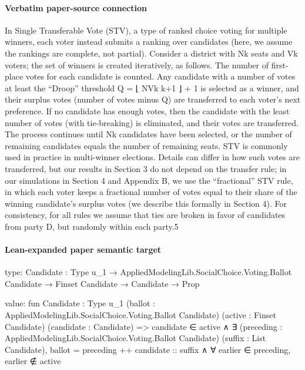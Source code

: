 \documentclass[10pt]{article}
\begin{document}
\paragraph{Verbatim paper-source connection}
\begin{ReviewVerbatim}
In Single Transferable Vote (STV), a type of ranked choice voting for multiple winners, each
voter instead submits a ranking over candidates (here, we assume the rankings are complete, not
partial). Consider a district with Nk seats and Vk voters; the set of winners is created iteratively, as
follows. The number of first-place votes for each candidate is counted. Any candidate with a number
of votes at least the “Droop” threshold Q = ⌊ NVk k+1 ⌋ + 1 is selected as a winner, and their surplus
votes (number of votes minus Q) are transferred to each voter’s next preference. If no candidate has
enough votes, then the candidate with the least number of votes (with tie-breaking) is eliminated,
and their votes are transferred. The process continues until Nk candidates have been selected, or
the number of remaining candidates equals the number of remaining seats. STV is commonly used
in practice in multi-winner elections.
    Details can differ in how such votes are transferred, but our results in Section 3 do not depend
on the transfer rule; in our simulations in Section 4 and Appendix B, we use the “fractional” STV
rule, in which each voter keeps a fractional number of votes equal to their share of the winning
candidate’s surplus votes (we describe this formally in Section 4). For consistency, for all rules we
assume that ties are broken in favor of candidates from party D, but randomly within each party.5
\end{ReviewVerbatim}



\paragraph{Lean-expanded paper semantic target}
\begin{ReviewVerbatim}
type:
{Candidate : Type u_1} → AppliedModelingLib.SocialChoice.Voting.Ballot Candidate → Finset Candidate → Candidate → Prop

value:
fun {Candidate : Type u_1} (ballot : AppliedModelingLib.SocialChoice.Voting.Ballot Candidate)
    (active : Finset Candidate) (candidate : Candidate) =>
  candidate ∈ active ∧
    ∃ (preceding : AppliedModelingLib.SocialChoice.Voting.Ballot Candidate) (suffix : List Candidate),
      ballot = preceding ++ candidate :: suffix ∧ ∀ earlier ∈ preceding, earlier ∉ active
\end{ReviewVerbatim}
\end{document}
